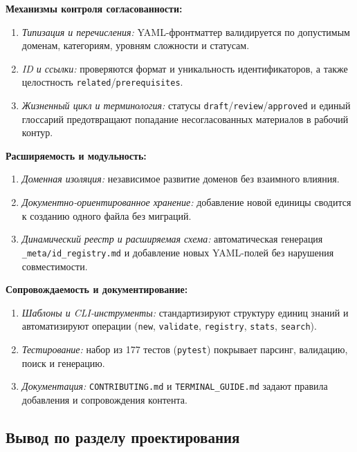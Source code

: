 
\textbf{Механизмы контроля согласованности:}
\begin{enumerate}
    \item \textit{Типизация и перечисления:} YAML-фронтматтер валидируется по допустимым доменам, категориям, уровням сложности и статусам.
    \item \textit{ID и ссылки:} проверяются формат и уникальность идентификаторов, а также целостность \texttt{related}/\texttt{prerequisites}.
    \item \textit{Жизненный цикл и терминология:} статусы \texttt{draft}/\texttt{review}/\texttt{approved} и единый глоссарий предотвращают попадание несогласованных материалов в рабочий контур.
\end{enumerate}

\textbf{Расширяемость и модульность:}
\begin{enumerate}
    \item \textit{Доменная изоляция:} независимое развитие доменов без взаимного влияния.
    \item \textit{Документно-ориентированное хранение:} добавление новой единицы сводится к созданию одного файла без миграций.
    \item \textit{Динамический реестр и расширяемая схема:} автоматическая генерация \texttt{\_meta/id\_registry.md} и добавление новых YAML-полей без нарушения совместимости.
\end{enumerate}

\textbf{Сопровождаемость и документирование:}
\begin{enumerate}
    \item \textit{Шаблоны и CLI-инструменты:} стандартизируют структуру единиц знаний и автоматизируют операции (\texttt{new}, \texttt{validate}, \texttt{registry}, \texttt{stats}, \texttt{search}).
    \item \textit{Тестирование:} набор из 177 тестов (\texttt{pytest}) покрывает парсинг, валидацию, поиск и генерацию.
    \item \textit{Документация:} \texttt{CONTRIBUTING.md} и \texttt{TERMINAL\_GUIDE.md} задают правила добавления и сопровождения контента.
\end{enumerate}

\subsection{Вывод по разделу проектирования}

